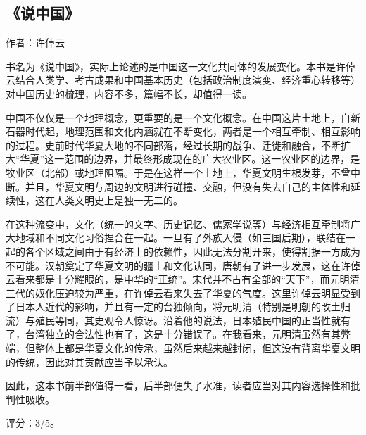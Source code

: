 \subsection{《说中国》}

作者：许倬云

书名为《说中国》，实际上论述的是中国这一文化共同体的发展变化。本书是许倬云结合人类学、考古成果和中国基本历史（包括政治制度演变、经济重心转移等）对中国历史的梳理，内容不多，篇幅不长，却值得一读。

中国不仅仅是一个地理概念，更重要的是一个文化概念。在中国这片土地上，自新石器时代起，地理范围和文化内涵就在不断变化，两者是一个相互牵制、相互影响的过程。史前时代华夏大地的不同部落，经过长期的战争、迁徙和融合，不断扩大“华夏”这一范围的边界，并最终形成现在的广大农业区。这一农业区的边界，是牧业区（北部）或地理阻隔。于是在这样一个土地上，华夏文明生根发芽，不曾中断。并且，华夏文明与周边的文明进行碰撞、交融，但没有失去自己的主体性和延续性，这在人类文明史上是独一无二的。

在这种流变中，文化（统一的文字、历史记忆、儒家学说等）与经济相互牵制将广大地域和不同文化习俗捏合在一起。一旦有了外族入侵（如三国后期），联结在一起的各个区域之间由于有经济上的依赖性，因此无法分割开来，使得割据一方成为不可能。汉朝奠定了华夏文明的疆土和文化认同，唐朝有了进一步发展，这在许倬云看来都是十分耀眼的，是中华的“正统”。宋代并不占有全部的“天下”，而元明清三代的奴化压迫较为严重，在许倬云看来失去了华夏的气度。这里许倬云明显受到了日本人近代的影响，并且有一定的台独倾向，将元明清（特别是明朝的改土归流）与殖民等同，其史观令人惊讶。沿着他的说法，日本殖民中国的正当性就有了，台湾独立的合法性也有了，这是十分错误了。在我看来，元明清虽然有其弊端，但整体上都是华夏文化的传承，虽然后来越来越封闭，但这没有背离华夏文明的传统，因此对其贡献应当予以承认。

因此，这本书前半部值得一看，后半部便失了水准，读者应当对其内容选择性和批判性吸收。

评分：3/5。